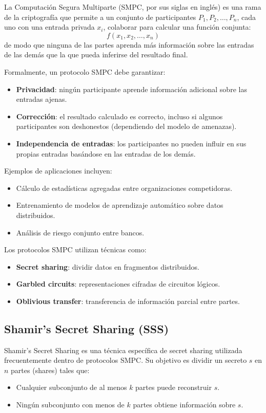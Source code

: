 \documentclass{article}
\begin{document}
La Computación Segura Multiparte (SMPC, por sus siglas en inglés) es una rama de la criptografía que permite a un conjunto de participantes \( P_1, P_2, \ldots, P_n \), cada uno con una entrada privada \( x_i \), colaborar para calcular una función conjunta:
\[
f(x_1, x_2, \ldots, x_n)
\]
de modo que ninguna de las partes aprenda más información sobre las entradas de las demás que la que pueda inferirse del resultado final.

Formalmente, un protocolo SMPC debe garantizar:
\begin{itemize}
    \item \textbf{Privacidad}: ningún participante aprende información adicional sobre las entradas ajenas.
    \item \textbf{Corrección}: el resultado calculado es correcto, incluso si algunos participantes son deshonestos (dependiendo del modelo de amenazas).
    \item \textbf{Independencia de entradas}: los participantes no pueden influir en sus propias entradas basándose en las entradas de los demás.
\end{itemize}

Ejemplos de aplicaciones incluyen:
\begin{itemize}
    \item Cálculo de estadísticas agregadas entre organizaciones competidoras.
    \item Entrenamiento de modelos de aprendizaje automático sobre datos distribuidos.
    \item Análisis de riesgo conjunto entre bancos.
\end{itemize}

Los protocolos SMPC utilizan técnicas como:
\begin{itemize}
    \item \textbf{Secret sharing}: dividir datos en fragmentos distribuidos.
    \item \textbf{Garbled circuits}: representaciones cifradas de circuitos lógicos.
    \item \textbf{Oblivious transfer}: transferencia de información parcial entre partes.
\end{itemize}

\subsection{Shamir’s Secret Sharing (SSS)}

Shamir’s Secret Sharing es una técnica específica de secret sharing utilizada frecuentemente dentro de protocolos SMPC. Su objetivo es dividir un secreto \( s \) en \( n \) partes (shares) tales que:
\begin{itemize}
    \item Cualquier subconjunto de al menos \( k \) partes puede reconstruir \( s \).
    \item Ningún subconjunto con menos de \( k \) partes obtiene información sobre \( s \).
\end{itemize}
\end{document}
